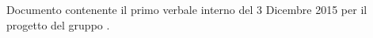 Documento contenente il primo verbale interno del 3 Dicembre 2015 per il progetto \progetto{} del gruppo \gruppo{}.
